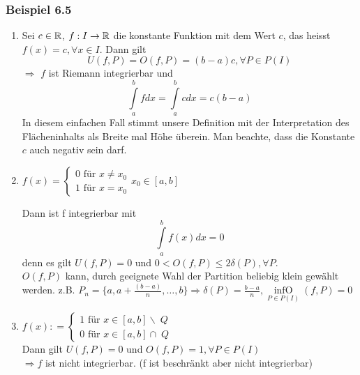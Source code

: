 \subsubsection*{Beispiel 6.5}
\begin{enumerate}[\indent 1)]
\item Sei $c\in \mathbb{R}$, $f:I\to \mathbb{R}$ die konstante Funktion mit dem Wert $c$, das heisst $f(x)=c, \forall x\in I$. Dann gilt \[U(f,P)=O(f,P)=(b-a)c, \forall P\in P(I)\] $\Rightarrow$ $f$ ist Riemann integrierbar und \[\int\limits_a^b {fdx}  = \int\limits_a^b {cdx = c(b - a)} \] In diesem einfachen Fall stimmt unsere Definition mit der Interpretation des Flächeninhalts als Breite mal Höhe überein. Man beachte, dass die Konstante $c$ auch negativ sein darf. 
\item $f(x) = \left\{ {\begin{array}{*{20}{c}}
{0{\text{ für }}x \ne {x_0}}\\
{1{\text{ für }}x = {x_0}}
\end{array}} \right.{x_0} \in [a,b]$

\begin{center}
\end{center}



Dann ist f integrierbar mit \[\int\limits_a^b {f(x)dx = 0}\] denn es gilt $U(f,P)=0$ und $0<O(f,P) \leq 2\delta(P), \forall P$.\\

$O(f,P)$ kann, durch geeignete Wahl der Partition beliebig klein gewählt werden. z.B. $P_n=\{a,a+\frac{{(b - a)}}{n},\dots,b\} \Rightarrow \delta (P)=\frac{b-a}{n}, \mathop {\inf O}\limits_{P \in P(I)}(f,P) = 0$

\item $f(x): = \left\{ {\begin{array}{*{20}{c}}
{1{\text{ für }}x \in [a,b]\backslash \;Q}\\
{0{\text{ für }}x \in [a,b] \cap \;Q}
\end{array}} \right.$
\\

Dann gilt $U(f,P)=0$ und $O(f,P)=1, \forall P\in P(I)$\\
$\Rightarrow f$ ist nicht integrierbar. (f ist beschränkt aber nicht integrierbar)
\end{enumerate}

